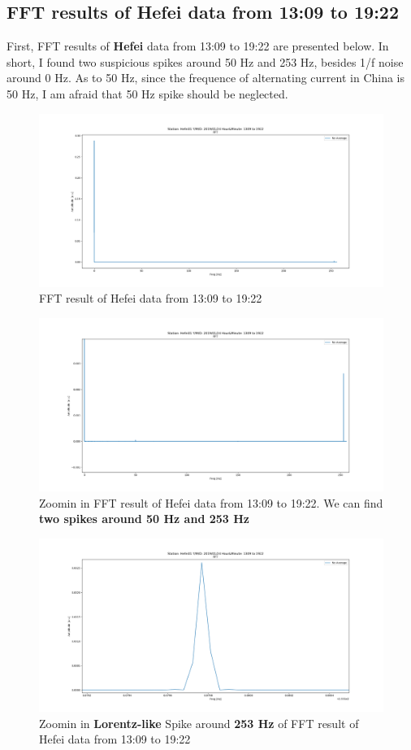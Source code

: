 \documentclass[
11pt, %
a4paper %
]{article}%
\theoremstyle{plain}
\begin{document}
\subsection{FFT results of \textbf{Hefei} data from 13:09 to 19:22}
First, FFT results of \textbf{Hefei} data from 13:09 to 19:22 are presented below. In short, I found two suspicious spikes around 50 Hz and 253 Hz, besides 1/f noise around 0 Hz. As to 50 Hz, since the frequence of alternating current in China is 50 Hz, I am afraid that 50 Hz spike should be neglected. 
\newpage
\begin{figure}[ht]
	\centering
	\includegraphics[width=\textwidth]{Figure_2.png}
	\caption{FFT result of Hefei data from 13:09 to 19:22}
	\label{fig:hefei2}
\end{figure}
\begin{figure}[ht]
	\centering
	\includegraphics[width=\textwidth]{Figure_2_1.png}
	\caption{Zoomin in FFT result of Hefei data from 13:09 to 19:22. We can find \textbf{two spikes around 50 Hz and 253 Hz}}
	\label{fig:hefei2_1}
\end{figure}
\begin{figure}[ht]
	\centering
	\includegraphics[width=\textwidth]{Figure_2_5.png}
	\caption{Zoomin in \textbf{Lorentz-like} Spike around \textbf{253 Hz} of FFT result of Hefei data from 13:09 to 19:22}
	\label{fig:hefei2_5}
\end{figure}
\end{document}
